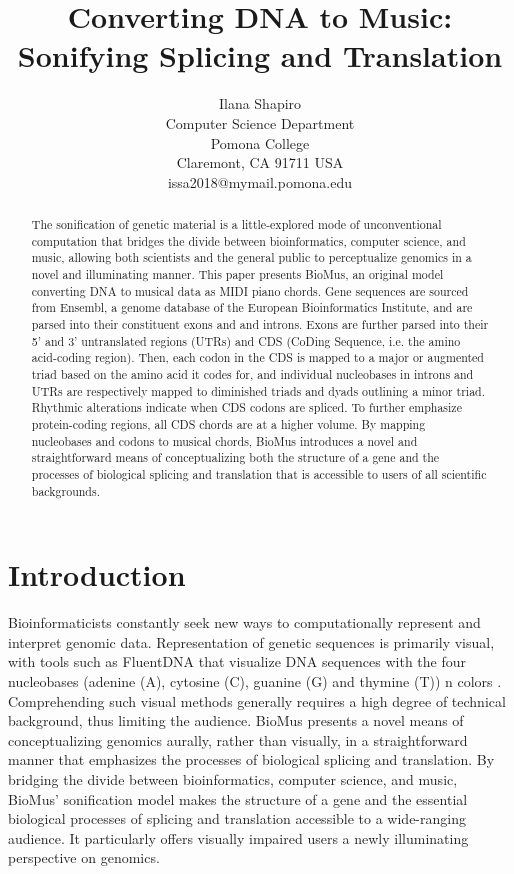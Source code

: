 \documentclass[letterpaper]{article}
\title{Converting DNA to Music: Sonifying Splicing and Translation}
\author{Ilana Shapiro\\
Computer Science Department\\
Pomona College\\
Claremont, CA 91711 USA\\
issa2018@mymail.pomona.edu\\
}
\begin{document}
 
\maketitle
\begin{abstract}
The sonification of genetic material is a little-explored mode of unconventional computation that bridges the divide between bioinformatics, computer science, and music, allowing both scientists and the general public to perceptualize genomics in a novel and illuminating manner. This paper presents BioMus, an original model converting DNA to musical data as MIDI piano chords. Gene sequences are sourced from Ensembl, a genome database of the European Bioinformatics Institute, and are parsed into their constituent exons and and introns. Exons are further parsed into their 5' and 3' untranslated regions (UTRs) and CDS (CoDing Sequence, i.e. the amino acid-coding region). Then, each codon in the CDS is mapped to a major or augmented triad based on the amino acid it codes for, and individual nucleobases in introns and UTRs are respectively mapped to diminished triads and dyads outlining a minor triad. Rhythmic alterations indicate when CDS codons are spliced. To further emphasize protein-coding regions, all CDS chords are at a higher volume. By mapping nucleobases and codons to musical chords, BioMus introduces a novel and straightforward means of conceptualizing both the structure of a gene and the processes of biological splicing and translation that is accessible to users of all scientific backgrounds.
\end{abstract}

\section{Introduction}
Bioinformaticists constantly seek new ways to computationally represent and interpret genomic data. Representation of genetic sequences is primarily visual, with tools such as FluentDNA that visualize DNA sequences with the four nucleobases (adenine (A), cytosine (C), guanine (G) and thymine (T)) n colors \cite{seaman_buggs_2020}.
Comprehending such visual methods generally requires a high degree of technical background, thus limiting the audience. BioMus presents a novel means of conceptualizing genomics aurally, rather than visually, in a straightforward manner that emphasizes the processes of biological splicing and translation. By bridging the divide between bioinformatics, computer science, and music, BioMus' sonification model makes the structure of a gene and the essential biological processes of splicing and translation accessible to a wide-ranging audience. It particularly offers visually impaired users a newly illuminating perspective on genomics.
\end{document}
